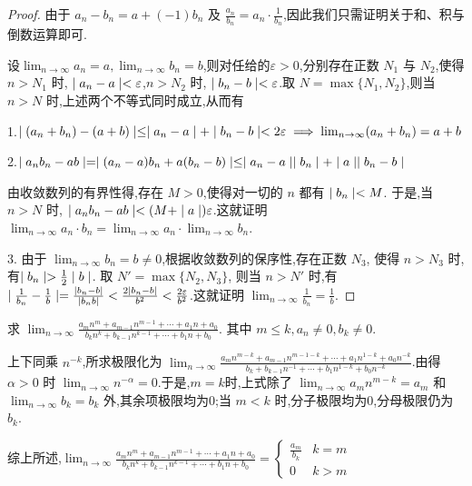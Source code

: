 \begin{proof}
    由于 $a_n-b_n=a+(-1)b_n$ 及 $\frac{a_n}{b_n}=a_n\cdot \frac{1}{b_n}$,因此我们只需证明关于和、积与倒数运算即可.

    设$\lim_{n\to\infty} a_n=a,\lim_{n\to\infty} b_n=b$,则对任给的$\varepsilon>0$,分别存在正数 $N_1$ 与 $N_2$,使得$n>N_1$ 时, $\mid a_n-a \mid<\varepsilon$,$n>N_2$ 时, $\mid b_n-b \mid<\varepsilon$.取 $N=\max\{N_1,N_2\}$,则当 $n>N$ 时,上述两个不等式同时成立,从而有

    1.$\mid (a_n+b_n)-(a+b) \mid\le \mid a_n-a \mid+\mid b_n-b \mid<2\varepsilon\implies \lim_{n\to\infty} (a_n+b_n)=a+b
    $

    2.$\mid a_nb_n-ab \mid=\mid (a_n-a)b_n+a(b_n-b) \mid\le \mid a_n-a \mid\mid b_n \mid+\mid a \mid\mid b_n-b \mid$

    由收敛数列的有界性得,存在 $M>0$,使得对一切的 $n$ 都有 $\mid b_n \mid<M$. 于是,当 $n>N$ 时, $\mid a_nb_n-ab \mid<(M+\mid a \mid)\varepsilon$.这就证明 $\lim_{n\to\infty} a_n\cdot b_n=\lim_{n\to\infty} a_n\cdot\lim_{n\to\infty} b_n$.

    3. 由于 $\lim_{n\to\infty} b_n=b\ne 0$,根据收敛数列的保序性,存在正数 $N_3$, 使得 $n>N_3$ 时,有$\mid b_n \mid>\frac{1}{2}\mid b \mid$. 取 $N'=\max \{N_2,N_3\}$, 则当 $n>N'$ 时,有 $\mid \frac{1}{b_n}-\frac{1}{b} \mid=\frac{\mid b_n-b \mid}{\mid b_nb \mid}<\frac{2\mid b_n-b \mid}{b^2}<\frac{2\varepsilon}{b^2}$.这就证明 $\lim_{n\to\infty} \frac{1}{b_n}=\frac{1}{b}.$
\end{proof}

\begin{example}[抓大头]
    求 $\lim_{n\to\infty} \frac{a_mn^{m}+a_{m-1}n^{m-1}+\cdots +a_1n+a_0}{b_kn^{k}+b_{k-1}n^{k-1}+\cdots +b_1n+b_0}$. 其中 $m\le k,a_n\ne 0,b_k\ne 0$.
\end{example}

\begin{solve}
    上下同乘 $n^{-k}$,所求极限化为 $\lim_{n\to\infty} \frac{a_mn^{m-k}+a_{m-1}n^{m-1-k}+\cdots +a_1n^{1-k}+a_0n^{-k}}{b_k+b_{k-1}n^{-1}+\cdots +b_1n^{1-k}+b_0n^{-k}}$.由得 $\alpha>0$ 时 $\lim_{n\to\infty} n^{-\alpha}=0$.于是,$m=k$时,上式除了 $\lim_{n\to\infty} a_mn^{m-k}=a_m$ 和 $\lim_{n\to\infty} b_k=b_k$ 外,其余项极限均为0;当 $m<k$ 时,分子极限均为0,分母极限仍为 $b_k$.

    综上所述,$\lim_{n\to\infty} \frac{a_mn^{m}+a_{m-1}n^{m-1}+\cdots +a_1n+a_0}{b_kn^{k}+b_{k-1}n^{k-1}+\cdots +b_1n+b_0}=\begin{cases}
        \frac{a_m}{b_k} & k=m \\
        0 & k>m
    \end{cases}$
\end{solve}


